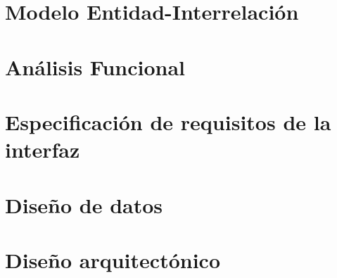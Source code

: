 \documentclass[a4paper,12pt]{book}
\begin{document}
   \chapter{Modelo Entidad-Interrelación}\label{modEntInt}
      
      
      
      

   \chapter{Análisis Funcional}
      
      
      

   \chapter{Especificación de requisitos de la interfaz}\label{espReqInt}
      
      
      

   \chapter{Diseño de datos}
      
      
      
      
      
      

   \chapter{Diseño arquitectónico}
      
      
\end{document}
